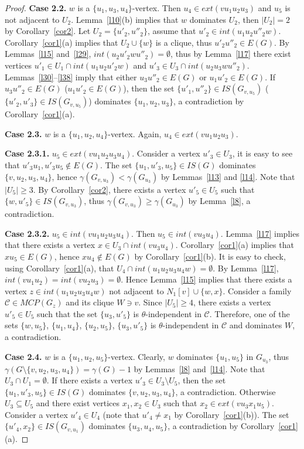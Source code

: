 \documentclass[12pt]{article}
\begin{document}
\begin{proof}
\textbf{Case 2.2.} $w$ is a $\{u_1,u_3,u_4\}$-vertex. Then $u_4 \in ext(vu_1u_2u_3)$ and $u_5$ is not adjacent to $U_2$. Lemma~\ref{l10}(b) implies that $w$ dominates $U_2$, then $|U_2| = 2$ by Corollary~\ref{cor2}. Let $U_2 = \{u'_2,u''_2\}$, assume that $u'_2 \in int(u_1u_2u''_2w)$. Corollary~\ref{cor1}(a) implies that $U_2 \cup \{w\}$ is a clique, thus $u'_2u''_2 \in E(G)$.  By Lemmas~\ref{l15} and~\ref{l29}, $int(u_2u'_2wu''_2) = \emptyset$, thus by Lemma~\ref{l17} there exist vertices $u'_1 \in U_1 \cap int(u_1u_2u'_2w)$ and $u'_3 \in U_3 \cap int(u_2u_3wu''_2)$. Lemmas~\ref{l30}--\ref{l38} imply that either $u_3u''_2 \in E(G)$ or $u_1u'_2 \in E(G)$. If $u_3u''_2 \in E(G)$ ($u_1u'_2 \in E(G)$), then the set $\{u'_1,u''_2\} \in IS(G_{v,u_5})$ ($\{u'_2,u'_3\} \in IS(G_{v,u_5})$) dominates $\{u_1,u_2,u_3\}$, a contradiction by Corollary~\ref{cor1}(a).

\textbf{Case 2.3.} $w$ is a $\{u_1,u_2,u_4\}$-vertex. Again, $u_4 \in ext(vu_1u_2u_3)$.

\textbf{Case 2.3.1.} $u_5 \in ext(vu_1u_2u_3u_4)$. Consider a vertex $u'_3 \in U_3$, it is easy to see that $u'_3u_1,u'_3u_5 \notin E(G)$. The set $\{u_1,u'_3,u_5\} \in IS(G)$ dominates $\{v,u_2,u_3,u_4\}$, hence $\gamma(G_{v,u_3}) < \gamma(G_{u_3})$ by Lemmas~\ref{l13} and \ref{l14}. Note that $|U_5| \geq 3$. By Corollary~\ref{cor2}, there exists a vertex $u'_5 \in U_5$ such that $\{w,u'_5\} \in IS(G_{v,u_3})$, thus $\gamma(G_{v,u_3}) \geq \gamma(G_{u_3})$ by Lemma~\ref{l8}, a contradiction.

\textbf{Case 2.3.2.} $u_5 \in int(vu_1u_2u_3u_4)$. Then $u_5 \in int(vu_3u_4)$. Lemma~\ref{l17} implies that there exists a vertex $x \in U_3 \cap int(vu_3u_4)$. Corollary~\ref{cor1}(a) implies that $xu_5 \in E(G)$, hence $xu_4 \notin E(G)$ by Corollary~\ref{cor1}(b). It is easy to check, using Corollary~\ref{cor1}(a), that $U_4 \cap int(u_1u_2u_3u_4w) = \emptyset$. By Lemma~\ref{l17}, $int(vu_1u_2) = int(vu_2u_3) = \emptyset$. Hence Lemma~\ref{l15} implies that there exists a vertex $z \in int(u_1u_2u_3u_4w)$ not adjacent to $N_1[v] \cup \{w,x\}$. Consider a family $\mathcal{C} \in MCP(G_z)$ and its clique $W \ni v$. Since $|U_5| \geq 4$, there exists a vertex $u'_5 \in U_5$ such that the set $\{u_3,u'_5\}$ is $\theta$-independent in $\mathcal{C}$. Therefore, one of the sets $\{w,u_5\}$, $\{u_1,u_4\}$, $\{u_2,u_5\}$, $\{u_3,u'_5\}$ is $\theta$-independent in $\mathcal{C}$ and dominates $W$, a contradiction.

\textbf{Case 2.4.} $w$ is a $\{u_1,u_2,u_5\}$-vertex. Clearly, $w$ dominates $\{u_1,u_5\}$ in $G_{u_3}$, thus $\gamma(G \setminus \{v,u_2,u_3,u_4\}) = \gamma(G) - 1$ by Lemmas~\ref{l8} and~\ref{l14}. Note that $U_3 \cap U_1 = \emptyset$. If there exists a vertex $u'_3 \in U_3 \setminus U_5$, then the set $\{u_1,u'_3,u_5\} \in IS(G)$ dominates $\{v,u_2,u_3,u_4\}$, a contradiction. Otherwise $U_3 \subseteq U_5$ and there exist vertices $x_1,x_2 \in U_3$ such that $x_2 \in ext(vu_3x_1u_5)$. Consider a vertex $u'_4 \in U_4$ (note that $u'_4 \neq x_1$ by Corollary~\ref{cor1}(b)). The set $\{u'_4,x_2\} \in IS(G_{v,u_1})$ dominates $\{u_3,u_4,u_5\}$, a contradiction by Corollary~\ref{cor1}(a).


\end{proof}
\end{document}
